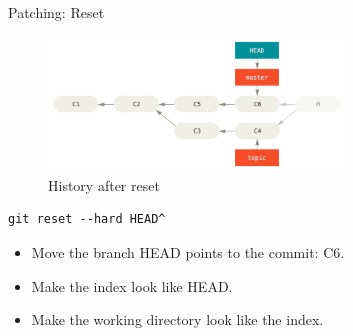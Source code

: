 \begin{frame}[fragile]{Patching: Reset}
  \begin{figure}
    \includegraphics[width=0.7\textwidth]{patching/undomerge-reset}
    \caption{History after reset}
  \end{figure}
  \begin{verbatim}
git reset --hard HEAD^
  \end{verbatim}
  \begin{itemize}
    \footnotesize
    \item Move the branch HEAD points to the commit: C6.
    \item Make the index look like HEAD.
    \item Make the working directory look like the index.
  \end{itemize}
\end{frame}
